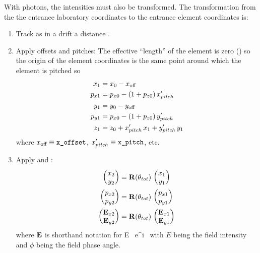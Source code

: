 With photons, the intensities must also be transformed.
The transformation from the the entrance laboratory coordinates to
the entrance element coordinates is:
\begin{enumerate}
\item
Track as in a drift a distance .
\item
{}
Apply offsets and pitches: The effective ``length'' of the element is
zero () so the origin of the element coordinates
is the same point around which the element is pitched so
\begin{align}
  x_1    &= x_0 - x_{\text{off}} \nonumber \\
  p_{x1} &= p_{x0} - (1 + p_{z0}) \, x'_{pitch} \nonumber \\
  y_1    &= y_0 - y_{\text{off}} \\
  p_{y1} &= p_{x0} - (1 + p_{z0}) \, y'_{pitch} \nonumber \\
  z_1    &= z_0 + x'_{pitch} \, x_1 + y'_{pitch} \, y_1 \nonumber
\end{align}
where $x_{\text{off}} \equiv \vn{x_offset}$, $x'_{pitch} \equiv \vn{x_pitch}$, etc.
\item
Apply  and :
\begin{align}
  \begin{pmatrix} x_2 \\ y_2 \end{pmatrix} &=
    {\bf R} (\theta_{tot}) \,   
  \begin{pmatrix} x_1 \\ y_1 \end{pmatrix} \nonumber \\
  \begin{pmatrix} p_{x2} \\ p_{y2} \end{pmatrix} &=
    {\bf R} (\theta_{tot}) \, 
  \begin{pmatrix} p_{x1} \\ p_{y1} \end{pmatrix} \label{xyrtxy} \\ 
  \begin{pmatrix} {\bf E}_{x2} \\ {\bf E}_{y2} \end{pmatrix} &=
    {\bf R} (\theta_{tot}) \,   \begin{pmatrix} {\bf E}_{x1} \\ {\bf E}_{y1} \end{pmatrix} \nonumber
\end{align}
where ${\bf E}$ is shorthand notation for
\Begineq
  \bfE \equiv E \, e^{i \, \phi}
\Endeq
with $E$ being the field intensity and $\phi$ being the field phase angle.

\end{enumerate}
